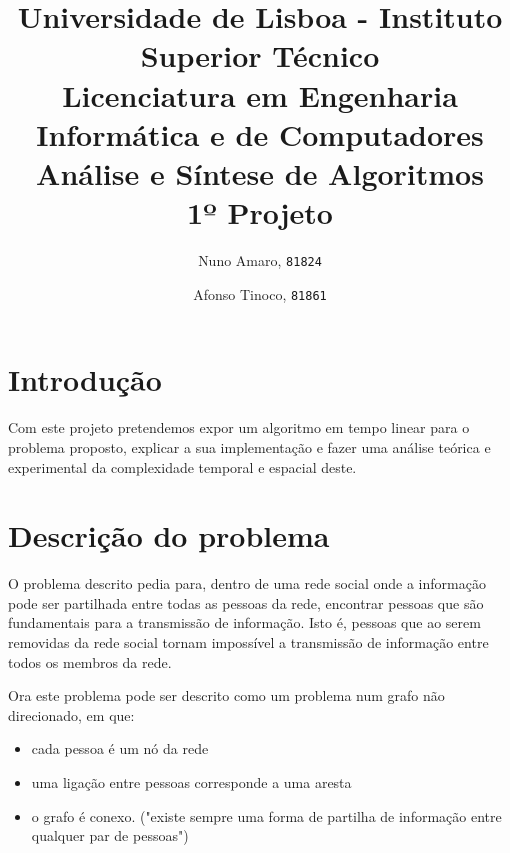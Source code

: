 \documentclass{scrartcl}
\begin{document}

\title{
	\textnormal{
	\LARGE Universidade de Lisboa - Instituto Superior Técnico\\
	\Large Licenciatura em Engenharia Informática e de Computadores\\
	\Large Análise e Síntese de Algoritmos
\\}
	\LARGE1º Projeto
	\vspace{-1ex}
	}
\author{Nuno Amaro,
	\texttt{81824}
	\and
	Afonso Tinoco,
	\texttt{81861}
}
\date{	\vspace{-1ex}
		\vspace{-4ex}
	}
\maketitle
\section*{Introdução}
Com este projeto pretendemos expor um algoritmo em tempo linear para o problema proposto, explicar a sua implementação e fazer uma análise teórica e experimental da complexidade temporal e espacial deste.

\section*{Descrição do problema}
O problema descrito pedia para, dentro de uma rede social onde a informação pode ser partilhada entre todas as pessoas da rede, encontrar pessoas que são fundamentais para a transmissão de informação. Isto é, pessoas que ao serem removidas da rede social tornam impossível a transmissão de informação entre todos os membros da rede.

Ora este problema pode ser descrito como um problema num grafo não direcionado, em que:
\begin{itemize}
\setlength\itemsep{-0.5ex}
\item cada pessoa é um nó da rede
\item uma ligação entre pessoas corresponde a uma aresta
\item o grafo é conexo. ("existe sempre uma forma de partilha de informação entre qualquer par de pessoas")
\end{itemize}
\end{document}

